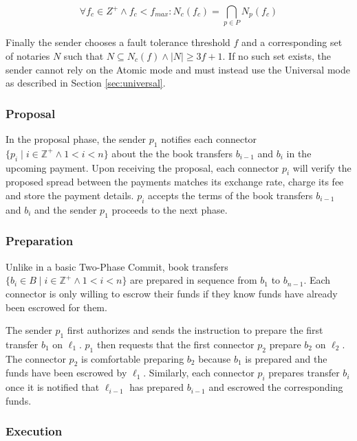 \documentclass[letterpaper,twocolumn,10pt]{article}
\begin{document}
\begin{equation}
\forall f_c \in Z^+ \land f_c < f_{max} : N_c(f_c) = \bigcap_{p \in P} N_p(f_c)
\end{equation}

Finally the sender chooses a fault tolerance threshold $f$ and a corresponding set of notaries $N$ such that $N \subseteq N_c(f) \land \left\vert{N}\right\vert \geq 3f+1$. If no such set exists, the sender cannot rely on the Atomic mode and must instead use the Universal mode as described in Section \ref{sec:universal}.


\subsubsection{Proposal}

In the proposal phase, the sender $p_1$ notifies each connector $ \{ p_i \mid i \in \mathbb{Z}^+ \land 1 < i < n \} $ about the the book transfers $b_{i-1}$ and $b_i$ in the upcoming payment. Upon receiving the proposal, each connector $p_i$ will verify the proposed spread between the payments matches its exchange rate, charge its fee and store the payment details. $p_i$ accepts the terms of the book transfers $b_{i-1}$ and $b_i$ and the sender $p_1$ proceeds to the next phase.


\subsubsection{Preparation}

Unlike in a basic Two-Phase Commit, book transfers
$ \{ b_i \in B \mid i \in \mathbb{Z}^+ \land 1 < i < n \} $
are prepared in sequence from $b_1$ to $b_{n-1}$. Each connector is only willing to escrow their funds if they know funds have already been escrowed for them.

The sender $p_1$ first authorizes and sends the instruction to prepare the first transfer $b_1$ on $\ell_1$. $p_1$ then requests that the first connector $p_2$ prepare $b_2$ on $\ell_2$. The connector $p_2$ is comfortable preparing $b_2$ because $b_1$ is prepared and the funds have been escrowed by $\ell_1$. Similarly, each connector $p_i$ prepares transfer $b_i$ once it is notified that $\ell_{i-1}$ has prepared $b_{i-1}$ and escrowed the corresponding funds.


\subsubsection{Execution}
\end{document}
